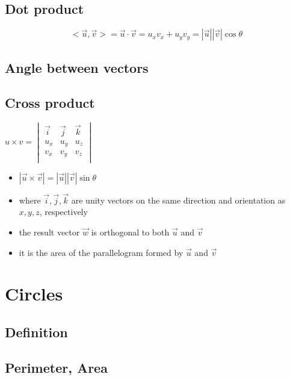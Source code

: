 \subsection{Dot product}
\[
    <\vec{u}, \vec{v}> = \vec{u} \cdot \vec{v} = u_xv_x + u_yv_y = |\vec{u}||\vec{v}|\cos \theta
\]


\subsection{Angle between vectors}

\subsection{Cross product}

$
            u\times v = \begin{vmatrix}
                \vec{i} & \vec{j} & \vec{k} \\
                u_x & u_y & u_z \\
                v_x & v_y & v_z \\
            \end{vmatrix}
$
\begin{itemize}
\item $|\vec{u}\times \vec{v}| = |\vec{u}||\vec{v}|\sin \theta$
\item where $\vec{i}, \vec{j}, \vec{k}$ are unity vectors on the same direction and orientation as $x, y, z$, respectively
\item the result vector $\vec{w}$ is orthogonal to both $\vec{u}$ and $\vec{v}$
\item it is the area of the parallelogram formed by $\vec{u}$ and $\vec{v}$
\end{itemize}


\section{Circles}

\subsection{Definition}

\subsection{Perimeter, Area}

